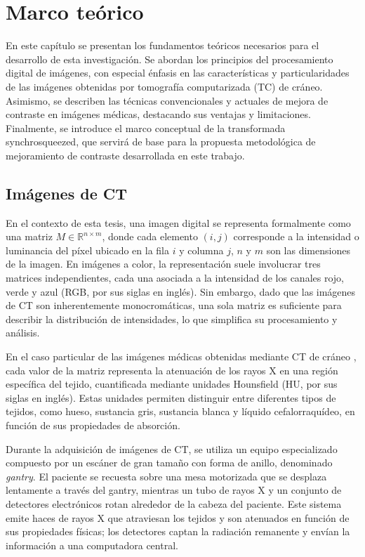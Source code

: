 \chapter{Marco teórico}\label{chapter:state-of-the-art}

En este capítulo se presentan los fundamentos teóricos necesarios para el desarrollo de esta investigación. Se abordan los principios del procesamiento digital de imágenes, con especial énfasis en las características y particularidades de las imágenes obtenidas por tomografía computarizada (TC) de cráneo. Asimismo, se describen las técnicas convencionales y actuales de mejora de contraste en imágenes médicas, destacando sus ventajas y limitaciones. Finalmente, se introduce el marco conceptual de la transformada synchrosqueezed, que servirá de base para la propuesta metodológica de mejoramiento de contraste desarrollada en este trabajo.

\section{Imágenes de CT}

En el contexto de esta tesis, una imagen digital se representa formalmente como una matriz $ M \in \mathbb{R}^{n \times m} $, donde cada elemento $ (i, j) $ corresponde a la intensidad o luminancia del píxel ubicado en la fila $ i $ y columna $ j $, $ n $ y $ m $ son las dimensiones de la imagen. En imágenes a color, la representación suele involucrar tres matrices independientes, cada una asociada a la intensidad de los canales rojo, verde y azul (RGB, por sus siglas en inglés). Sin embargo, dado que las imágenes de CT son inherentemente monocromáticas, una sola matriz es suficiente para describir la distribución de intensidades, lo que simplifica su procesamiento y análisis.%

En el caso particular de las imágenes médicas obtenidas mediante CT de cráneo \cite{Flandrin2018}, cada valor de la matriz representa la atenuación de los rayos X en una región específica del tejido, cuantificada mediante unidades Hounsfield (HU, por sus siglas en inglés). Estas unidades permiten distinguir entre diferentes tipos de tejidos, como hueso, sustancia gris, sustancia blanca y líquido cefalorraquídeo, en función de sus propiedades de absorción.%

Durante la adquisición de imágenes de CT, se utiliza un equipo especializado compuesto por un escáner de gran tamaño con forma de anillo, denominado \textit{gantry}. El paciente se recuesta sobre una mesa motorizada que se desplaza lentamente a través del gantry, mientras un tubo de rayos X y un conjunto de detectores electrónicos rotan alrededor de la cabeza del paciente. Este sistema emite haces de rayos X que atraviesan los tejidos y son atenuados en función de sus propiedades físicas; los detectores captan la radiación remanente y envían la información a una computadora central.%

